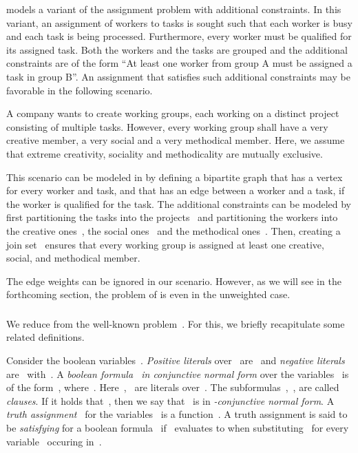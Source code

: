 \begin{example}
  \pCBMs{} models a variant of the assignment problem with additional constraints. In this variant, an assignment of workers to tasks is sought such that each worker is busy and each task is being processed. Furthermore, every worker must be qualified for its assigned task. Both the workers and the tasks are grouped and the additional constraints are of the form ``At least one worker from group A must be assigned a task in group B''. An assignment that satisfies such additional constraints may be favorable in the following scenario. 

A company wants to create working groups, each working on a distinct project consisting of multiple tasks. However, every working group shall have a very creative member, a very social and a very methodical member. Here, we assume that extreme creativity, sociality and methodicality are mutually exclusive. 

This scenario can be modeled in \pCBMs{} by defining a bipartite graph that has a vertex for every worker and task, and that has an edge between a worker and a task, if the worker is qualified for the task. The additional constraints can be modeled by first partitioning the tasks into the projects~ and partitioning the workers into the creative ones~, the social ones~ and the methodical ones~. Then, creating a join set~ ensures that every working group is assigned at least one creative, social, and methodical member. 

The edge weights can be ignored in our scenario. However, as we will see in the forthcoming section, the problem of \pCBMs{} is \NPh{} even in the unweighted case.

\end{example}

\subsubsection{\NPHs}

We reduce from the well-known \ptSATs{} problem~\cite{Kar72}. For this, we briefly recapitulate some related definitions.
\begin{definition}
Consider the boolean variables~. \emph{Positive literals} over~ are~ and \emph{negative literals} are~ with~. A \emph{boolean formula~ in conjunctive normal form} over the variables~ is of the form~, where~. Here~,~ are literals over~. The subformulas~,~, are called \emph{clauses}. If it holds that~, then we say that~ is in \emph{-conjunctive normal form}. A \emph{truth assignment}~ for the variables~ is a function~. A truth assignment is said to be \emph{satisfying} for a boolean formula~ if~ evaluates to  when substituting~ for every variable~ occuring in~.
\end{definition}

